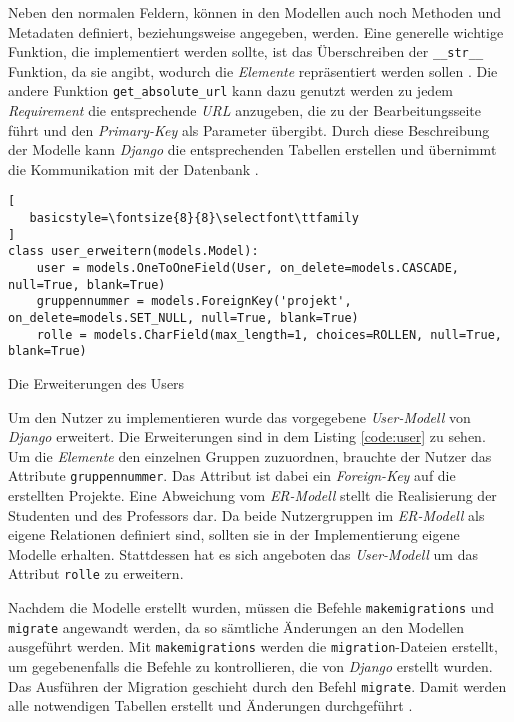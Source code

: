 \documentclass[11pt,a4paper]{report}
\begin{document}
Neben den normalen Feldern, können in den Modellen auch noch Methoden und Metadaten definiert, beziehungsweise angegeben, werden. Eine generelle wichtige Funktion, die implementiert werden sollte, ist das Überschreiben der \verb|__str__| Funktion, da sie angibt, wodurch die \textit{Elemente} repräsentiert werden sollen \cite{mozillatuto5}. Die andere Funktion \verb|get_absolute_url| kann dazu genutzt werden zu jedem \textit{Requirement} die entsprechende \textit{URL} anzugeben, die zu der Bearbeitungsseite führt und den \textit{Primary-Key} als Parameter übergibt. Durch diese Beschreibung der Modelle kann \textit{Django} die entsprechenden Tabellen erstellen und übernimmt die Kommunikation mit der Datenbank \cite{djangotuto4}.


\begin{listing}[htbp]
\begin{lstlisting}[
   basicstyle=\fontsize{8}{8}\selectfont\ttfamily
]
class user_erweitern(models.Model):
    user = models.OneToOneField(User, on_delete=models.CASCADE, null=True, blank=True)
    gruppennummer = models.ForeignKey('projekt', on_delete=models.SET_NULL, null=True, blank=True)
    rolle = models.CharField(max_length=1, choices=ROLLEN, null=True, blank=True)
\end{lstlisting}
\caption{Die Erweiterungen des Users}
\label{code:user}
\end{listing}


Um den Nutzer zu implementieren wurde das vorgegebene \textit{User-Modell} von \textit{Django} erweitert. Die Erweiterungen sind in dem Listing \ref{code:user} zu sehen. Um die \textit{Elemente} den einzelnen Gruppen zuzuordnen, brauchte der Nutzer das Attribute \verb|gruppennummer|. Das Attribut ist dabei ein \textit{Foreign-Key} auf die erstellten Projekte. Eine Abweichung vom \textit{ER-Modell} stellt die Realisierung der Studenten und des Professors dar. Da beide Nutzergruppen im \textit{ER-Modell} als eigene Relationen definiert sind, sollten sie in der Implementierung eigene Modelle erhalten. Stattdessen hat es sich angeboten das \textit{User-Modell} um das Attribut \verb|rolle| zu erweitern.



Nachdem die Modelle erstellt wurden, müssen die Befehle \verb|makemigrations| und \verb|migrate| angewandt werden, da so sämtliche Änderungen an den Modellen ausgeführt werden. Mit \verb|makemigrations| werden die \verb|migration|-Dateien erstellt, um gegebenenfalls die Befehle zu kontrollieren, die von \textit{Django} erstellt wurden. Das Ausführen der Migration geschieht durch den Befehl \verb|migrate|. Damit werden alle notwendigen Tabellen erstellt und Änderungen durchgeführt \cite{djangotuto4}.
\end{document}

